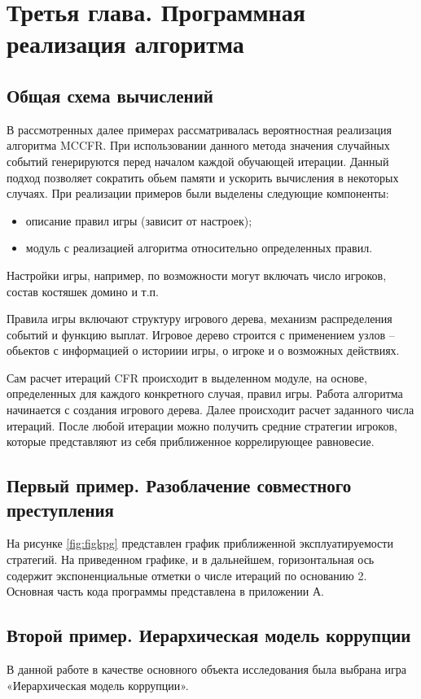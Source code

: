 \chapter{Третья глава. Программная реализация алгоритма}
\label{cha:ch_3}
\section{Общая схема вычислений}

\par
В рассмотренных далее примерах рассматривалась вероятностная реализация алгоритма MCCFR. При использовании данного метода значения случайных событий генерируются перед началом каждой обучающей итерации. Данный подход позволяет сократить обьем памяти и ускорить вычисления в некоторых случаях\cite{MCCFR}.
При реализации примеров были выделены следующие компоненты:
\begin{itemize}
	\item описание правил игры (зависит от настроек);
	\item модуль с реализацией алгоритма относительно определенных правил.
\end{itemize}
\par
Настройки игры, например, по возможности могут включать число игроков, состав костяшек домино и т.п.
\par
Правила игры включают структуру игрового дерева, механизм распределения событий и функцию выплат. Игровое дерево строится с применением узлов -- обьектов с информацией о историии игры, о игроке и о возможных действиях.
\par
Сам расчет итераций CFR происходит в выделенном модуле, на основе, определенных для каждого конкретного случая, правил игры. Работа алгоритма начинается с создания игрового дерева. Далее происходит расчет заданного числа итераций. После любой итерации можно получить средние стратегии игроков, которые представляют из себя приближенное коррелирующее равновесие.

\section{Первый пример. Разоблачение совместного преступления}

На рисунке \ref{fig:figkpg} представлен график приближенной эксплуатируемости стратегий. На приведенном графике, и в дальнейшем, горизонтальная ось содержит экспоненциальные отметки о числе итераций по основанию 2. Основная часть кода программы представлена в приложении А.

\section{Второй пример. Иерархическая модель коррупции}

В данной работе в качестве основного объекта исследования была выбрана игра «Иерархическая модель коррупции». 